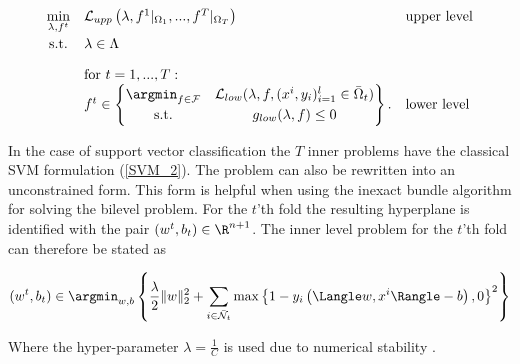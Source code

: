 
\begin{equation}
	\begin{array}{cll}
	\displaystyle\min_{\lambda, f^t} & \mathcal{L}_{upp}\left(\lambda,f^1|_{\Omega_1},...,f^T|_{\Omega_T}\right) & \text{upper level} \vspace{0.5ex}\\
	\text{s.t.} & \lambda \in \Lambda & \vspace{1em}\\
	& \text{for } t = 1,...,T: & \\
	& f^t \in \begin{Bmatrix} \displaystyle\argmin_{f\in \mathcal{F}} & \mathcal{L}_{low}(\lambda,f,(x^i,y_i)_{i = 1}^l\in \bar{\Omega}_t) \vspace{0.5ex}\\
	                        \text{s.t.} & g_{low}(\lambda,f) \leq 0 
													\end{Bmatrix}. & \text{lower level}
	\end{array}
\end{equation}

In the case of support vector classification the \(T\) inner problems have the classical SVM formulation %
(\ref{SVM_2}). %
The problem can also be rewritten into an unconstrained form. This form is helpful when using the inexact bundle algorithm for solving the bilevel problem.
For the \(t\)'th fold the resulting hyperplane is identified with the pair \((w^t,b_t) \in \R^{n+1}\).
The inner level problem for the \(t\)'th fold can therefore be stated as



\begin{equation}
	(w^t,b_t) \in \argmin_{w,b} \left\{\frac{\lambda}{2} \|w\|^2_2+\sum_{i\in \bar{\mathcal{N}}_t}{\max\left\{1-y_i\left(\Langle w,x^i\Rangle-b\right),0\right\}^2}\right\}
\label{lower_t_2}
\end{equation}

Where the hyper-parameter \(\lambda = \frac{1}{C}\) is used  due to numerical stability \cite[p. 38]{Kunapuli2008}.

